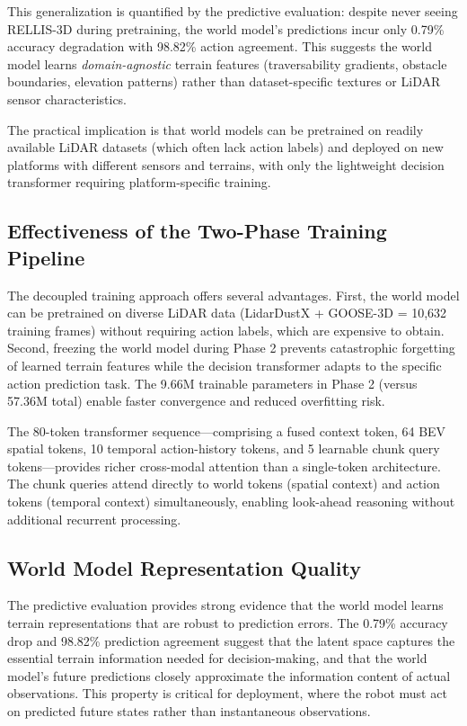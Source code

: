 \documentclass[journal]{IEEEtran}
\begin{document}
This generalization is quantified by the predictive evaluation: despite never seeing RELLIS-3D during pretraining, the world model's predictions incur only 0.79\% accuracy degradation with 98.82\% action agreement. This suggests the world model learns \emph{domain-agnostic} terrain features (traversability gradients, obstacle boundaries, elevation patterns) rather than dataset-specific textures or LiDAR sensor characteristics.

The practical implication is that world models can be pretrained on readily available LiDAR datasets (which often lack action labels) and deployed on new platforms with different sensors and terrains, with only the lightweight decision transformer requiring platform-specific training.

\subsection{Effectiveness of the Two-Phase Training Pipeline}

The decoupled training approach offers several advantages. First, the world model can be pretrained on diverse LiDAR data (LidarDustX + GOOSE-3D = 10,632 training frames) without requiring action labels, which are expensive to obtain. Second, freezing the world model during Phase 2 prevents catastrophic forgetting of learned terrain features while the decision transformer adapts to the specific action prediction task. The 9.66M trainable parameters in Phase 2 (versus 57.36M total) enable faster convergence and reduced overfitting risk.

The 80-token transformer sequence—comprising a fused context token, 64 BEV spatial tokens, 10 temporal action-history tokens, and 5 learnable chunk query tokens—provides richer cross-modal attention than a single-token architecture. The chunk queries attend directly to world tokens (spatial context) and action tokens (temporal context) simultaneously, enabling look-ahead reasoning without additional recurrent processing.

\subsection{World Model Representation Quality}

The predictive evaluation provides strong evidence that the world model learns terrain representations that are robust to prediction errors. The 0.79\% accuracy drop and 98.82\% prediction agreement suggest that the latent space captures the essential terrain information needed for decision-making, and that the world model's future predictions closely approximate the information content of actual observations. This property is critical for deployment, where the robot must act on predicted future states rather than instantaneous observations.
\end{document}
